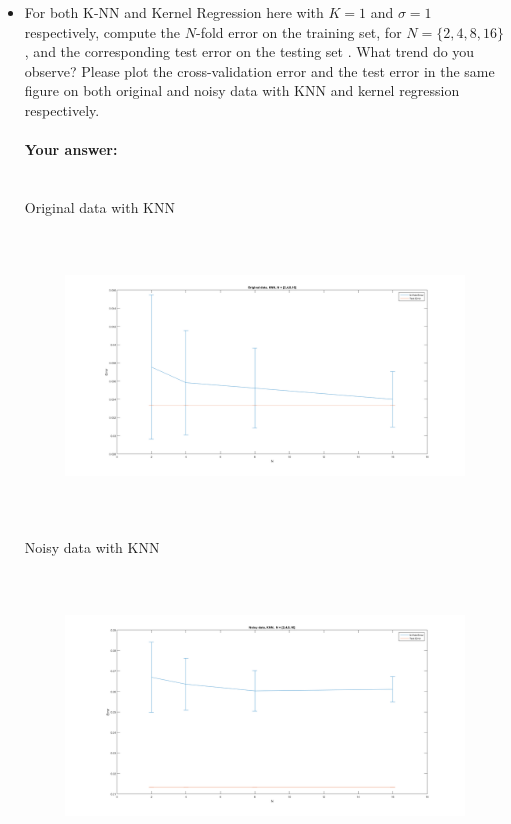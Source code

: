 \documentclass[english]{article}
\begin{document}
\begin{itemize}
\item For both K-NN and Kernel Regression here with $K = 1$ and $\sigma = 1$ respectively, compute the  $N$-fold error on the training set, for $N = \{2, 4, 8, 16\}$, and the corresponding test error on the testing set .  What trend do you observe? Please plot the cross-validation error and the test error in the same figure on both original and noisy data with KNN and kernel regression respectively.

 
 \paragraph{Your answer:}
 ~\\ 
 
Original data with KNN
\begin{figure}[H]
\centering
\includegraphics[width=7in, height=3in]{knn_OG_varyN.png}
\end{figure}
 
Noisy data with KNN
\begin{figure}[H]
\centering
\includegraphics[width=7in, height=3in]{knn_noisy_varyN.png}
\end{figure}
 

\end{itemize}
\end{document}
